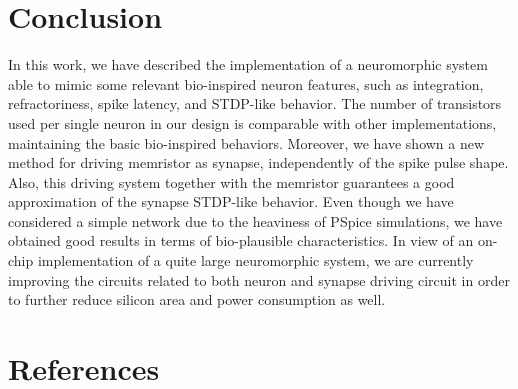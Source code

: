 \documentclass[review]{elsarticle}
\begin{document}
\section{Conclusion}
In this work, we have described the implementation of a neuromorphic system able to mimic some relevant bio-inspired neuron  features, such as integration, refractoriness, spike latency, and STDP-like behavior. The number of transistors used per single neuron in our design is comparable with other implementations, maintaining the basic bio-inspired behaviors. Moreover, we have shown a new method for driving memristor as synapse, independently of the spike pulse shape. Also, this driving system together with the memristor guarantees a good approximation of the synapse STDP-like behavior. Even though we have considered a simple network due to the heaviness of PSpice simulations, we have obtained good results in terms of bio-plausible characteristics. %
In view of an on-chip implementation of a quite large neuromorphic system, we are currently improving the circuits related to both neuron and synapse driving circuit in order to further reduce silicon area and power consumption as well.



%
%

\section*{References}


\end{document}
